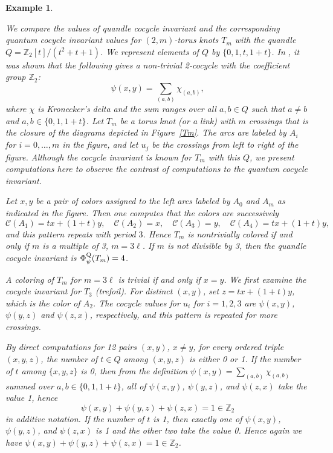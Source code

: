 \documentclass[11pt,fleqn]{amsart} %
\newcommand\Z{{\mathbb Z}}
\newtheorem{example}[theorem]{Example}
\begin{document}
	\begin{example}\label{ex:quandleinv}
		{\rm 
			We compare the values of quandle cocycle invariant and the corresponding quantum cocycle invariant values
			for $(2,m)$-torus knots $T_m$ 
			with the quandle $Q=\Z_2[t]/(t^2 + t + 1)$.
			We represent elements of $Q$ by $\{0,1,t, 1+t\}$. 
			 In \cite{CJKS}, it was shown that the following gives a non-trivial 2-cocycle  with the coefficient group $\Z_2$: 
			$$\psi(x,y)=\sum_{(a,b)}  \chi_{(a,b)},$$
			where $\chi$ is Kronecker's delta and the sum ranges over 
			all $a,b \in Q$ such that $a\neq b$ and $a,b \in \{ 0,1,1+t\}$. 
			Let $T_m$ be a torus knot (or a link) with $m$ crossings that is the closure of the diagrams  depicted in Figure~\ref{Tm}. The arcs are labeled by $A_i$ for $i=0, \ldots, m$ in the figure, and let $u_j$ be the crossings from left to right of the figure.
			Although the cocycle invariant is known for $T_m$ with this $Q$, we present computations here to observe the contrast of computations to the quantum cocycle  invariant.
			
			Let $x, y$ be a pair of colors assigned to the left arcs labeled by $A_0$ and $A_m$
			as indicated in the figure.
			Then one computes that the colors  are successively
			$$ \mathcal C (A_1)= tx + (1+t)y, \quad  \mathcal C (A_2)=x, \quad \mathcal C (A_3)= y, \quad 
			\mathcal C (A_4)= tx + (1+t)y, $$
			and this pattern repeats with period $3$. Hence $T_m$ is 
			nontrivially  colored  if and only if $m$ is a multiple of 3, $m=3\ell$. 
			If $m$ is not divisible by 3, then the quandle cocycle invariant is $\Phi^{\rm Q}_\psi (T_m)=4$.
			
			
			A coloring of $T_m$  for $m=3 \ell$ is trivial if and only if $x=y$. 
			We first examine the cocycle invariant for $T_3$ (trefoil).
			For distinct $(x,y)$, set $z=tx + (1+t)y$, which is the color of $A_2$. 
			The cocycle values for $u_i$ for $i=1,2,3$ are $\psi(x,y)$, $\psi(y,z)$ and $\psi(z,x)$, respectively, 
			and this pattern is repeated for more crossings. 
			
			By direct computations for 12 pairs $(x,y)$, $x \neq y$, for every ordered triple $(x,y,z)$, the number of $t \in Q$ 
			among $(x,y,z)$ is either 0 or 1. 
			If the number of $t$ among $\{ x,y,z \}$ is 0, then 
			from the definition $\psi(x,y)=\sum_{(a,b)}  \chi_{(a,b)}$ summed over $a,b \in \{ 0,1,1+t\}$, all of 
			$\psi(x,y)$, $\psi(y,z)$, and  $\psi(z,x)$ take the value 1, hence 
			$$\psi(x,y)+\psi(y,z)+ \psi(z,x) = 1 \in \Z_2  $$
			in additive notation.
			If the number of $t$ is 1, then exactly one of $\psi(x,y)$, $\psi(y,z)$, and  $\psi(z,x)$ is 1 and the other two take the value  0. Hence again we have $\psi(x,y)+\psi(y,z)+ \psi(z,x) = 1 \in \Z_2  $. 
			
}
\end{example}
\end{document}
